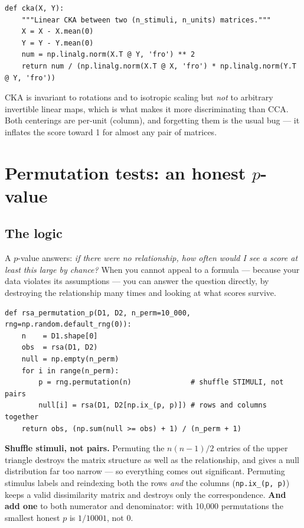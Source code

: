 \documentclass[11pt]{article}
\begin{document}
\begin{lstlisting}
def cka(X, Y):
    """Linear CKA between two (n_stimuli, n_units) matrices."""
    X = X - X.mean(0)
    Y = Y - Y.mean(0)
    num = np.linalg.norm(X.T @ Y, 'fro') ** 2
    return num / (np.linalg.norm(X.T @ X, 'fro') * np.linalg.norm(Y.T @ Y, 'fro'))
\end{lstlisting}

CKA is invariant to rotations and to isotropic scaling but \emph{not} to
arbitrary invertible linear maps, which is what makes it more discriminating
than CCA. Both centerings are per-unit (column), and forgetting them is the
usual bug --- it inflates the score toward 1 for almost any pair of matrices.

\section{Permutation tests: an honest $p$-value}

\subsection{The logic}

A $p$-value answers: \emph{if there were no relationship, how often would I see a
score at least this large by chance?} When you cannot appeal to a formula ---
because your data violates its assumptions --- you can answer the question
directly, by destroying the relationship many times and looking at what scores
survive.

\begin{lstlisting}
def rsa_permutation_p(D1, D2, n_perm=10_000, rng=np.random.default_rng(0)):
    n    = D1.shape[0]
    obs  = rsa(D1, D2)
    null = np.empty(n_perm)
    for i in range(n_perm):
        p = rng.permutation(n)              # shuffle STIMULI, not pairs
        null[i] = rsa(D1, D2[np.ix_(p, p)]) # rows and columns together
    return obs, (np.sum(null >= obs) + 1) / (n_perm + 1)
\end{lstlisting}

\begin{keybox}
 \textbf{Shuffle stimuli, not pairs.}
Permuting the $n(n-1)/2$ entries of the upper triangle destroys the matrix
structure as well as the relationship, and gives a null distribution far too
narrow --- so everything comes out significant. Permuting stimulus labels and
reindexing both the rows \emph{and} the columns (\texttt{np.ix\_(p, p)}) keeps a
valid dissimilarity matrix and destroys only the correspondence. \textbf{And add
one} to both numerator and denominator: with 10,000 permutations the smallest
honest $p$ is $1/10001$, not $0$.
\end{keybox}
\end{document}
